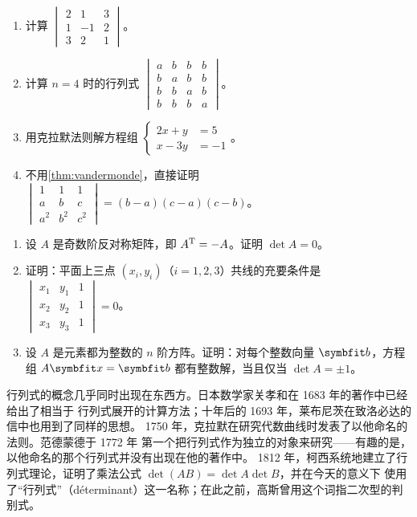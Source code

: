 \begin{exercises}
\begin{enumerate}
  \item 计算 $\begin{vmatrix}2&1&3\\1&-1&2\\3&2&1\end{vmatrix}$。
  \item 计算 $n=4$ 时的行列式 $\begin{vmatrix}a&b&b&b\\b&a&b&b\\b&b&a&b\\b&b&b&a\end{vmatrix}$。
  \item 用克拉默法则解方程组 $\left\{\begin{aligned}2x+y&=5\\x-3y&=-1\end{aligned}\right.$。
  \item 不用\cref{thm:vandermonde}，直接证明
        $\begin{vmatrix}1&1&1\\a&b&c\\a^2&b^2&c^2\end{vmatrix}=(b-a)(c-a)(c-b)$。
\end{enumerate}
\begin{enumerate}
  \item 设 $A$ 是奇数阶反对称矩阵，即 $A^{\mathrm{T}}=-A$。证明 $\det A=0$。
  \item 证明：平面上三点 $(x_i,y_i)$（$i=1,2,3$）共线的充要条件是
        $\begin{vmatrix}x_1&y_1&1\\x_2&y_2&1\\x_3&y_3&1\end{vmatrix}=0$。
  \item 设 $A$ 是元素都为整数的 $n$ 阶方阵。证明：对每个整数向量 $\vb{b}$，方程组 $A\vb{x}=\vb{b}$
        都有整数解，当且仅当 $\det A=\pm1$。
\end{enumerate}
\end{exercises}

\begin{history}
行列式的概念几乎同时出现在东西方。日本数学家关孝和在 1683 年的著作中已经给出了相当于
行列式展开的计算方法；十年后的 1693 年，莱布尼茨在致洛必达的信中也用到了同样的思想。
1750 年，克拉默在研究代数曲线时发表了以他命名的法则\parencite{kline1972}。范德蒙德于 1772 年
第一个把行列式作为独立的对象来研究——有趣的是，以他命名的那个行列式并没有出现在他的著作中。
1812 年，柯西系统地建立了行列式理论，证明了乘法公式 $\det(AB)=\det A\det B$，并在今天的意义下
使用了“行列式”（déterminant）这一名称；在此之前，高斯曾用这个词指二次型的判别式。
\end{history}
